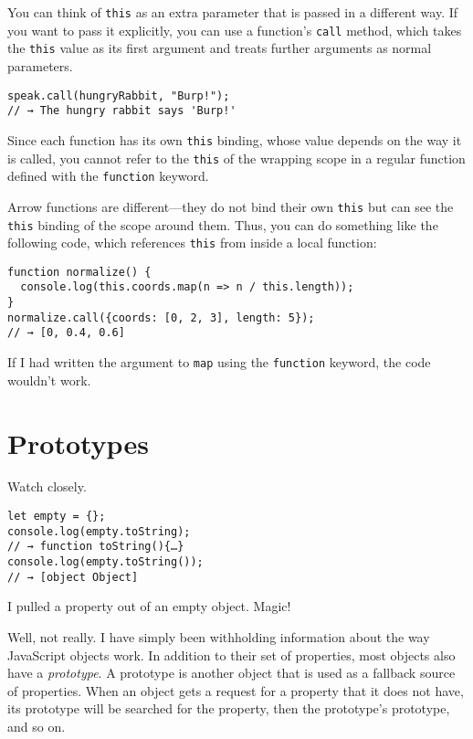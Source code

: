 \label{object.call_method}You can think of \lstinline`this` as an extra parameter that is passed in a different way. If you want to pass it explicitly, you can use a function's \lstinline`call` method, which takes the \lstinline`this` value as its first argument and treats further arguments as normal parameters.

\begin{lstlisting}
speak.call(hungryRabbit, "Burp!");
// → The hungry rabbit says 'Burp!'
\end{lstlisting}
\noindent

Since each function has its own \lstinline`this` binding, whose value depends on the way it is called, you cannot refer to the \lstinline`this` of the wrapping scope in a regular function defined with the \lstinline`function` keyword.

Arrow functions are different—they do not bind their own \lstinline`this` but can see the \lstinline`this` binding of the scope around them. Thus, you can do something like the following code, which references \lstinline`this` from inside a local function:

\begin{lstlisting}
function normalize() {
  console.log(this.coords.map(n => n / this.length));
}
normalize.call({coords: [0, 2, 3], length: 5});
// → [0, 0.4, 0.6]
\end{lstlisting}
\noindent{}

If I had written the argument to \lstinline`map` using the \lstinline`function` keyword, the code wouldn't work.

\label{object.prototypes}\section{Prototypes}

Watch closely.

\begin{lstlisting}
let empty = {};
console.log(empty.toString);
// → function toString(){…}
console.log(empty.toString());
// → [object Object]
\end{lstlisting}
\noindent{}

I pulled a property out of an empty object. Magic!

Well, not really. I have simply been withholding information about the way JavaScript objects work. In addition to their set of properties, most objects also have a \emph{prototype}. A prototype is another object that is used as a fallback source of properties. When an object gets a request for a property that it does not have, its prototype will be searched for the property, then the prototype's prototype, and so on.

